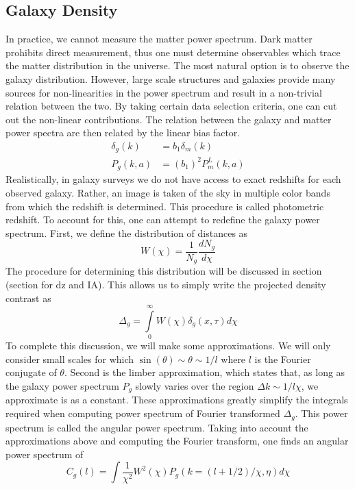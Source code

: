 \subsection{Galaxy Density}
In practice, we cannot measure the matter power spectrum. Dark matter prohibits direct measurement, thus one must determine observables which trace the matter distribution in the universe. The most natural option is to observe the galaxy distribution. However, large scale structures and galaxies provide many sources for non-linearities in the power spectrum and result in a non-trivial relation between the two. By taking certain data selection criteria, one can cut out the non-linear contributions. The relation between the galaxy and matter power spectra are then related by the linear bias factor.
\begin{equation}
	\begin{split}
		\delta_g(k) &= b_1 \delta_m(k) \\
		P_g(k,a) &= (b_1)^2P_m^L(k,a)
	\end{split}
\end{equation}
Realistically, in galaxy surveys we do not have access to exact redshifts for each observed galaxy. Rather, an image is taken of the sky in multiple color bands from which the redshift is determined. This procedure is called photometric redshift. To account for this, one can attempt to redefine the galaxy power spectrum. First, we define the distribution of distances as
\begin{equation}
	W(\chi) = \frac{1}{N_g}\frac{dN_g}{d\chi}
\end{equation}
The procedure for determining this distribution will be discussed in section (section for dz and IA). This allows us to simply write the projected density contrast as
\begin{equation}
	\Delta_g = \int\limits_0^\infty W(\chi)\delta_g(x,\tau)d\chi
\end{equation}
To complete this discussion, we will make some approximations. We will only consider small scales for which $\sin(\theta)\sim \theta \sim 1/l$ where $l$ is the Fourier conjugate of $\theta$. Second is the limber approximation, which states that, as long as the galaxy power spectrum $P_g$ slowly varies over the region $\Delta k \sim 1/l\chi$, we approximate is as a constant. These approximations greatly simplify the integrals required when computing power spectrum of Fourier transformed $\Delta_g$. This power spectrum is called the angular power spectrum. Taking into account the approximations above and computing the Fourier transform, one finds an angular power spectrum of
\begin{equation}
 	C_g(l) =\int \frac{1}{\chi^2}W^2(\chi)P_g(k=(l+1/2)/\chi,\eta) d\chi
\end{equation} 
